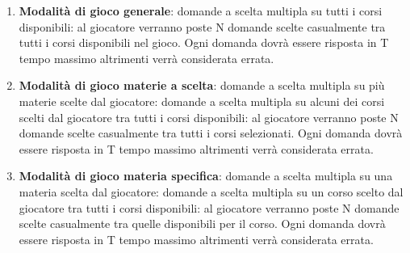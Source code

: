         \begin{enumerate}
            \item \textbf{Modalità di gioco generale}: domande a scelta multipla su tutti i corsi disponibili: al giocatore verranno poste N domande scelte casualmente tra tutti i corsi disponibili nel gioco. Ogni domanda dovrà essere risposta in T tempo massimo altrimenti verrà considerata errata.
            
            \item \textbf{Modalità di gioco materie a scelta}: domande a scelta multipla su più materie scelte dal giocatore: domande a scelta multipla su alcuni dei corsi scelti dal giocatore tra tutti i corsi disponibili: al giocatore verranno poste N domande scelte casualmente tra tutti i corsi selezionati. Ogni domanda dovrà essere risposta in T tempo massimo altrimenti verrà considerata errata.
            
            \item \textbf{Modalità di gioco materia specifica}: domande a scelta multipla su una materia scelta dal giocatore: domande a scelta multipla su un corso scelto dal giocatore tra tutti i corsi disponibili: al giocatore verranno poste N domande scelte casualmente tra quelle disponibili per il corso. Ogni domanda dovrà essere risposta in T tempo massimo altrimenti verrà considerata errata.
            

\end{enumerate}
